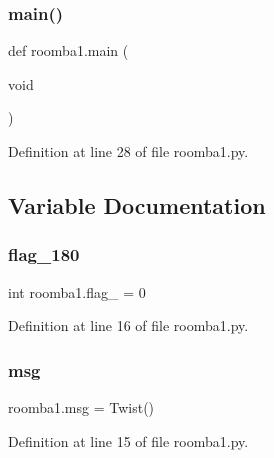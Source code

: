 \subsubsection{\texorpdfstring{main()}{main()}}
{\footnotesize\ttfamily def roomba1.\+main (\begin{DoxyParamCaption}\item[{void}]{ }\end{DoxyParamCaption})}



Definition at line 28 of file roomba1.\+py.



\subsection{Variable Documentation}
\mbox{\label{namespaceroomba1_a00837fdf66874d8273b272d12c3a93b4}} 
\subsubsection{\texorpdfstring{flag\_180}{flag\_180}}
{\footnotesize\ttfamily int roomba1.\+flag\+\_ = 0}



Definition at line 16 of file roomba1.\+py.

\mbox{\label{namespaceroomba1_a6a8c8de93f17ada422622a6b13819af3}} 
\subsubsection{\texorpdfstring{msg}{msg}}
{\footnotesize\ttfamily roomba1.\+msg = Twist()}



Definition at line 15 of file roomba1.\+py.

